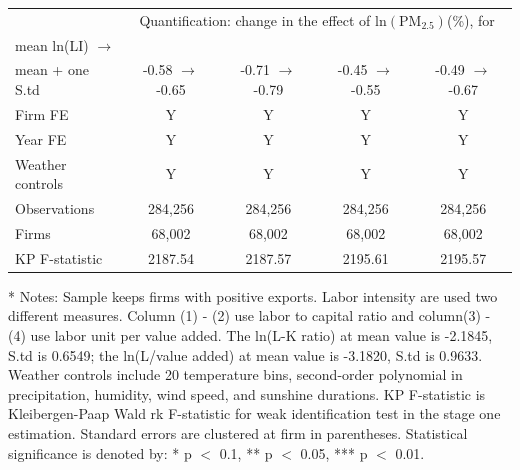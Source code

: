 \documentclass[12pt]{article}
\begin{document}
\begin{table}[H]
\begin{tabular}{l*{4}{c}}
                                    &\multicolumn{4}{c}{Quantification: change in the effect of $\mathrm{ln(PM_{2.5})}$(\%), for}\\           
      mean  ln(LI) $\rightarrow$       &&&&\\ 
      mean + one S.td              &-0.58 $\rightarrow$ -0.65 &	-0.71 $\rightarrow$ -0.79 &  -0.45 $\rightarrow$ -0.55 & -0.49 $\rightarrow$ -0.67 \\
      \hline
      Firm FE &Y&Y&Y&Y\\
      Year FE &Y&Y&Y&Y\\
      Weather controls &Y&Y&Y&Y\\
      \hline
      Observations 	         &284,256	&284,256&	284,256	  &284,256 \\
      Firms	                 &68,002	&68,002	& 68,002	  &68,002 \\
      KP F-statistic	       &2187.54	&2187.57& 2195.61	  &2195.57\\
      \hline\hline
    \end{tabular}
    \begin{tablenotes}
      \item[*] \small Notes: Sample keeps firms with positive exports. Labor intensity are used two different measures. Column (1) - (2) use labor to capital ratio and column(3) - (4) use labor unit per value added. The ln(L-K ratio) at mean value is -2.1845, S.td is 0.6549; the ln(L/value added) at mean value is -3.1820, S.td is 0.9633. Weather controls include 20 temperature bins, second-order polynomial in precipitation, humidity, wind speed, and sunshine durations. KP F-statistic is Kleibergen-Paap Wald rk F-statistic for weak identification test in the stage one estimation. Standard errors are clustered at firm in parentheses. Statistical significance is denoted by: * p $<$ 0.1, ** p $<$ 0.05, *** p $<$ 0.01.
    \end{tablenotes}
    \end{table}
\end{document}
